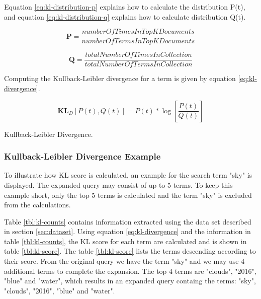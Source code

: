 Equation \ref{eq:kl-distribution-p} explains how to calculate the distribution P(t),
and equation \ref{eq:kl-distribution-q} explains how to calculate distribution Q(t).

\begin{cequation}[H]
	\begin{equation}
		\mathbf{P} = \frac{numberOfTimesInTopKDocuments}{numberOfTermsInTopKDocuments}
	\end{equation}
	\caption{}
  \label{eq:kl-distribution-p}
\end{cequation}

\begin{cequation}[H]
	\begin{equation}
		\mathbf{Q} = \frac{totalNumberOfTimesInCollection}{totalNumberOfTermsInCollection}
	\end{equation}
	\caption{}
  \label{eq:kl-distribution-q}
\end{cequation}

Computing the Kullback-Leibler divergence for a term is given by equation \ref{eq:kl-divergence}.

\begin{cequation}[H]
	\begin{equation}
		\mathbf{KL}_D[P(t), Q(t)] = P(t)*\log{[\frac{P(t)}{Q(t)}]}
	\end{equation}
	\caption{Kullback-Leibler Divergence.}
  \label{eq:kl-divergence}
\end{cequation}

\subsubsection{Kullback-Leibler Divergence Example}
To illustrate how KL score is calculated, an example for the search term "sky" is displayed.
The expanded query may consist of up to 5 terms.
To keep this example short, only the top 5 terms is calculated and the term "sky" is excluded from the calculations.

Table \ref{tbl:kl-counts} contains information extracted using the data set described in section \ref{sec:dataset}.
Using equation \ref{eq:kl-divergence} and the information in table \ref{tbl:kl-counts}, the KL score for each term are calculated and is shown in table \ref{tbl:kl-score}.
The table \ref{tbl:kl-score} lists the terms descending according to their score.
From the original query we have the term "sky" and we may use 4 additional terms to complete the expansion.
The top 4 terms are "clouds", "2016", "blue" and "water",
which results in an expanded query containg the terms: "sky", "clouds", "2016", "blue" and "water".


